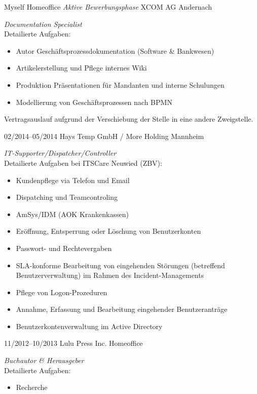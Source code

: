 \documentclass[a4paper]{friggeri-cv} %
\begin{document}
\begin{entrylist}
{Myself}
{Homeoffice}
{\emph{Aktive Bewerbungsphase}
}
{XCOM AG}
{Andernach}
{\emph{Documentation Specialist} \\
	Detailierte Aufgaben:
	\begin{itemize}
		\item Autor Geschäftsprozessdokumentation (Software \& Bankwesen)
		\item Artikelerstellung und Pflege internes Wiki
		\item Produktion Präsentationen für Mandanten und interne Schulungen
		\item Modellierung von Geschäftsprozessen nach BPMN
	\end{itemize}
	Vertragsauslauf aufgrund der Verschiebung der Stelle in eine andere Zweigstelle.
}
\entry
{02/2014--05/2014}
{Hays Temp GmbH / More Holding}
{Mannheim}
{\emph{IT-Supporter/Dispatcher/Controller} \\
    Detailierte Aufgaben bei ITSCare Neuwied (ZBV):
    \begin{itemize}
        \item Kundenpflege via Telefon und Email
        \item Dispatching und Teamcontroling
        \item AmSys/IDM (AOK Krankenkassen)
        \item Eröffnung, Entsperrung oder Löschung von Benutzerkonten
        \item Passwort- und Rechtevergaben
        \item SLA-konforme Bearbeitung von eingehenden Störungen (betreffend Benutzerverwaltung) im Rahmen des Incident-Managements
        \item Pflege von Logon-Prozeduren
        \item Annahme, Erfassung und Bearbeitung eingehender Benutzeranträge
        \item Benutzerkontenverwaltung im Active Directory
    \end{itemize}
}
\entry
{11/2012--10/2013}
{Lulu Press Inc.}
{Homeoffice}
{\emph{Buchautor \& Herausgeber}\\
    Detailierte Aufgaben:
    \begin{itemize}
        \item Recherche

\end{itemize}}
\end{entrylist}
\end{document}
